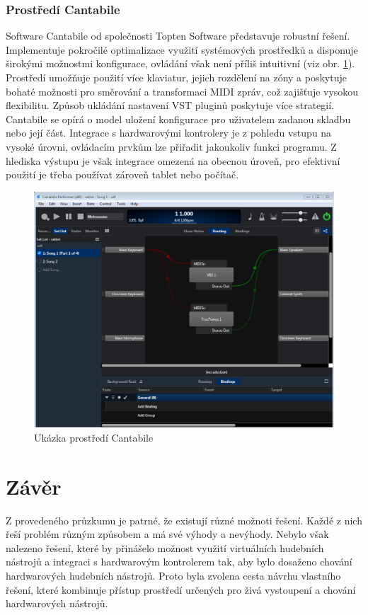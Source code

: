 \documentclass[thesis=M,czech]{FITthesis}[2019/03/06]
\begin{document}
	\subsubsection{Prostředí Cantabile}
	Software Cantabile od společnosti Topten Software představuje robustní řešení.
	Implementuje pokročilé optimalizace využití systémových prostředků a
	disponuje širokými možnostmi konfigurace, ovládání však není příliš intuitivní (viz obr. \ref{fig:Cantabile}).
	Prostředí umožňuje použití více klaviatur, jejich rozdělení na zóny a poskytuje bohaté možnosti
	pro směrování a transformaci MIDI zpráv, což zajišťuje vysokou flexibilitu.
	Způsob ukládání nastavení VST pluginů poskytuje více strategií.
	Cantabile se opírá o model uložení konfigurace pro uživatelem zadanou skladbu nebo její část.
	Integrace s hardwarovými kontrolery je z pohledu vstupu na vysoké úrovni, ovládacím prvkům lze přiřadit jakoukoliv 
	funkci programu. Z hlediska výstupu je však integrace omezená na obecnou úroveň, pro efektivní použití
	je třeba používat zároveň tablet nebo počítač.
	\begin{figure}[H]
		\centering
		\includegraphics[width=1\textwidth]{Cantabile}
		\caption{Ukázka prostředí Cantabile}\label{fig:Cantabile}
	\end{figure}
	
	\section{Závěr}
	Z provedeného průzkumu je patrné, že existují různé možnoti řešení. Každé z nich řeší problém různým způsobem a má své výhody a nevýhody.
	Nebylo však nalezeno řešení, které by přinášelo možnost využití virtuálních hudebních nástrojů a integraci s hardwarovým kontrolerem tak,
	aby bylo dosaženo chování hardwarových hudebních nástrojů. Proto byla zvolena cesta návrhu vlastního řešení, které kombinuje přístup
	prostředí určených pro živá vystoupení a chování hardwarových nástrojů.
	
\end{document}
